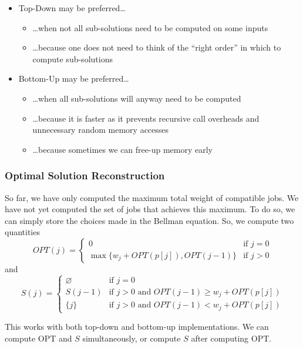 \begin{itemize}
    \item Top-Down may be preferred\dots
    \begin{itemize}
        \item {\dots}when not all sub-solutions need to be computed on some inputs
        \item {\dots}because one does not need to think of the ``right order'' in which to compute sub-solutions
    \end{itemize}

    \item Bottom-Up may be preferred\dots
    \begin{itemize}
        \item {\dots}when all sub-solutions will anyway need to be computed
        \item {\dots}because it is faster as it prevents recursive call overheads and unnecessary random memory accesses
        \item {\dots}because sometimes we can free-up memory early
    \end{itemize}
\end{itemize}

\subsubsection{Optimal Solution Reconstruction}

So far, we have only computed the maximum total weight of compatible jobs. We have not yet computed the set of jobs that achieves this maximum. To do so, we can simply store the choices made in the Bellman equation. So, we compute two quantities \[
    OPT(j) = \begin{cases}
        0                                   & \text{if } j = 0 \\
        \max\{w_j + OPT(p[j]), OPT(j - 1)\} & \text{if } j > 0
    \end{cases}
\] and \[
    S(j) = \begin{cases}
        \varnothing & \text{if } j = 0                                             \\
        S(j - 1)    & \text{if } j > 0 \text{ and } OPT(j - 1) \ge w_j + OPT(p[j]) \\
        \{j\}       & \text{if } j > 0 \text{ and } OPT(j - 1) < w_j + OPT(p[j])
    \end{cases}
\]

This works with both top-down and bottom-up implementations. We can compute OPT and $S$ simultaneously, or compute $S$ after computing OPT. 

